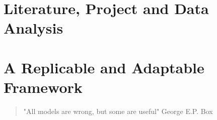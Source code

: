 \section{Literature, Project and Data Analysis}







\section{A Replicable and Adaptable Framework}

\begin{quote}
    "All models are wrong, but some are useful" George E.P. Box
\end{quote}

